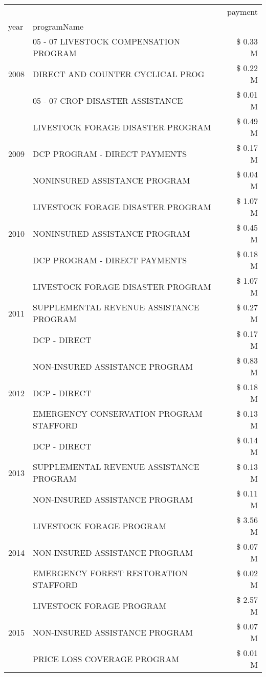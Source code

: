 \begin{tabular}{llr}
\toprule
 &  & payment \\
year & programName &  \\
\midrule
\multirow[t]{3}{*}{2008} & 05 - 07 LIVESTOCK COMPENSATION PROGRAM & \$ 0.33 M \\
 & DIRECT AND COUNTER CYCLICAL PROG & \$ 0.22 M \\
 & 05 - 07 CROP DISASTER ASSISTANCE & \$ 0.01 M \\
\cline{1-3}
\multirow[t]{3}{*}{2009} & LIVESTOCK FORAGE DISASTER  PROGRAM & \$ 0.49 M \\
 & DCP PROGRAM - DIRECT PAYMENTS & \$ 0.17 M \\
 & NONINSURED ASSISTANCE PROGRAM & \$ 0.04 M \\
\cline{1-3}
\multirow[t]{3}{*}{2010} & LIVESTOCK FORAGE DISASTER  PROGRAM & \$ 1.07 M \\
 & NONINSURED ASSISTANCE PROGRAM & \$ 0.45 M \\
 & DCP PROGRAM - DIRECT PAYMENTS & \$ 0.18 M \\
\cline{1-3}
\multirow[t]{3}{*}{2011} & LIVESTOCK FORAGE DISASTER PROGRAM & \$ 1.07 M \\
 & SUPPLEMENTAL REVENUE ASSISTANCE PROGRAM & \$ 0.27 M \\
 & DCP - DIRECT & \$ 0.17 M \\
\cline{1-3}
\multirow[t]{3}{*}{2012} & NON-INSURED ASSISTANCE PROGRAM & \$ 0.83 M \\
 & DCP - DIRECT & \$ 0.18 M \\
 & EMERGENCY CONSERVATION PROGRAM STAFFORD & \$ 0.13 M \\
\cline{1-3}
\multirow[t]{3}{*}{2013} & DCP - DIRECT & \$ 0.14 M \\
 & SUPPLEMENTAL REVENUE ASSISTANCE PROGRAM & \$ 0.13 M \\
 & NON-INSURED ASSISTANCE PROGRAM & \$ 0.11 M \\
\cline{1-3}
\multirow[t]{3}{*}{2014} & LIVESTOCK FORAGE PROGRAM & \$ 3.56 M \\
 & NON-INSURED ASSISTANCE PROGRAM & \$ 0.07 M \\
 & EMERGENCY FOREST RESTORATION STAFFORD & \$ 0.02 M \\
\cline{1-3}
\multirow[t]{3}{*}{2015} & LIVESTOCK FORAGE PROGRAM & \$ 2.57 M \\
 & NON-INSURED ASSISTANCE PROGRAM & \$ 0.07 M \\
 & PRICE LOSS COVERAGE PROGRAM & \$ 0.01 M \\
\cline{1-3}

\end{tabular}
